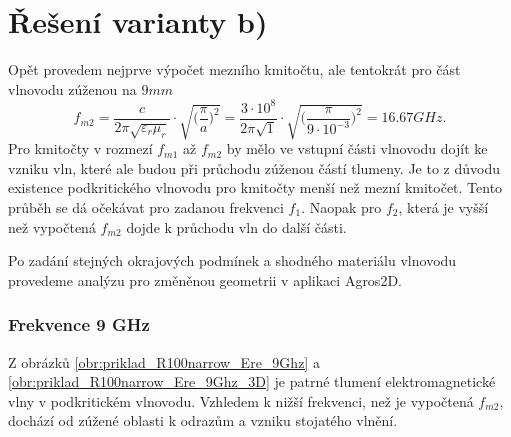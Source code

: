 \section{Řešení varianty b)}
Opět provedem nejprve výpočet mezního kmitočtu, ale tentokrát pro část vlnovodu zúženou na $9\unit{mm}$
\begin{displaymath}
f_{m2} = \frac{c}{2\pi\sqrt{\varepsilon_{r}\mu_{r}}}\cdot\sqrt{\bigg(\frac{\pi}{a}\bigg)^{2}} = \frac{3\cdot 10^{8}}{2\pi\sqrt{1}}\cdot\sqrt{\bigg(\frac{\pi}{9\cdot 10^{-3}}\bigg)^{2}} = 16.67 \unit{GHz}.
\end{displaymath}
Pro kmitočty v rozmezí $f_{m1}$ až $f_{m2}$ by mělo ve vstupní části vlnovodu dojít ke vzniku vln, které ale budou při průchodu zúženou částí tlumeny. Je to z důvodu existence  podkritického vlnovodu pro kmitočty menší než mezní kmitočet. Tento průběh se dá očekávat pro zadanou frekvenci $f_1$. Naopak pro $f_2$, která je vyšší než vypočtená $f_{m2}$ dojde k průchodu vln do další části.

Po zadání stejných okrajových podmínek a shodného materiálu vlnovodu provedeme analýzu pro změněnou geometrii v aplikaci Agros2D.

\subsubsection*{Frekvence 9 GHz}
Z obrázků \ref{obr:priklad_R100narrow_Ere_9Ghz} a \ref{obr:priklad_R100narrow_Ere_9Ghz_3D} je patrné tlumení elektromagnetické vlny v podkritickém vlnovodu. Vzhledem k nižší frekvenci, než je vypočtená $f_{m2}$, dochází od zúžené oblasti k odrazům a vzniku stojatého vlnění.

